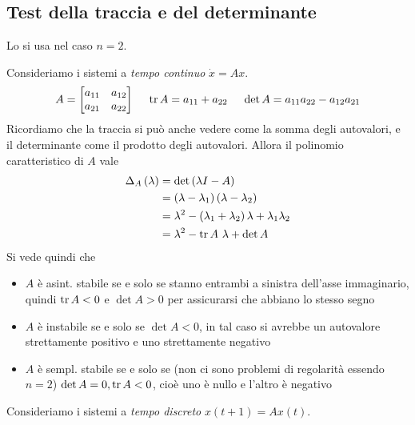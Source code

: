 \subsection{Test della traccia e del determinante}

Lo si usa nel caso $n=2$.

Consideriamo i sistemi a \textit{tempo continuo} $\dot{x} =Ax$.
\begin{equation*}
	A=\begin{bmatrix}
	a_{11} & a_{12}\\
	a_{21} & a_{22}
	\end{bmatrix} \ \ \ \ \operatorname{tr} A=a_{11} +a_{22} \ \ \ \ \det A=a_{11} a_{22} -a_{12} a_{21}
\end{equation*}
Ricordiamo che la traccia si può anche vedere come la somma degli autovalori, e il determinante come il prodotto degli autovalori. Allora il polinomio caratteristico di $A$ vale
\begin{equation*}
	\begin{aligned}
		\Delta _A\left(\lambda \right) & =\det\left(\lambda I-A\right)                                                   \\
		                               & =\left(\lambda -\lambda _1\right)\left(\lambda -\lambda _2\right)               \\
		                               & =\lambda ^2 -\left(\lambda _1 +\lambda _2\right) \lambda +\lambda _1 \lambda _2 \\
		                               & =\lambda ^2 -\operatorname{tr} A\ \lambda +\det A                                             
	\end{aligned}
\end{equation*}
Si vede quindi che
\begin{itemize}
	\item $A$ è asint. stabile se e solo se stanno entrambi a sinistra dell'asse immaginario, quindi $\operatorname{tr} A< 0$ e $\det A >0$ per assicurarsi che abbiano lo stesso segno
	\item $A$ è instabile se e solo se $\det A< 0$, in tal caso si avrebbe un autovalore strettamente positivo e uno strettamente negativo
	\item $A$ è sempl. stabile se e solo se (non ci sono problemi di regolarità essendo $n=2$) $\det A=0,\operatorname{tr} A< 0$, cioè uno è nullo e l'altro è negativo
\end{itemize}

Consideriamo i sistemi a \textit{tempo discreto} $x\left(t+1\right) =Ax\left(t\right)$.

